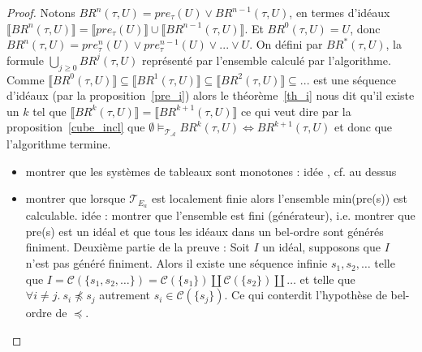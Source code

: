 \documentclass[a4paper, twoside]{scrartcl}
\theoremstyle{plain}%
\theoremstyle{definition}
\theoremstyle{remark}
\begin{document}
\begin{proof}

  Notons $BR^n(\tau, U) = pre_\tau(U) \vee BR^{n-1}(\tau, U)$, en
  termes d'idéaux $\llbracket BR^n(\tau, U) \rrbracket = \llbracket
  pre_\tau(U) \rrbracket \cup \llbracket BR^{n-1}(\tau, U)
  \rrbracket$. Et $BR^0(\tau, U) = U$, donc $BR^n(\tau, U) =
  pre_\tau^n(U) \vee pre_\tau^{n-1}(U) \vee ... \vee U $. On défini
  par $BR^*(\tau, U)$, la formule $\bigcup_{j\ge0} BR^j(\tau, U)$
  représenté par l'ensemble calculé par l'algorithme. Comme
  $\llbracket BR^0(\tau, U) \rrbracket \subseteq \llbracket BR^1(\tau,
  U) \rrbracket \subseteq \llbracket BR^2(\tau, U) \rrbracket
  \subseteq ...$ est une séquence d'idéaux (par la
  proposition~\ref{pre_i}) alors le théorème~\ref{th_i} nous dit qu'il
  existe un $k$ tel que $\llbracket BR^k(\tau, U) \rrbracket =
  \llbracket BR^{k+1}(\tau, U) \rrbracket$
  ce qui veut dire par la proposition~\ref{cube_incl} que $\emptyset
  \vDash_{\mathcal{T_A}} BR^k(\tau, U) \iff BR^{k+1}(\tau, U)$ et donc
  que l'algorithme termine.



  \bigskip
  \begin{itemize}
  \item montrer que les systèmes de tableaux sont monotones : idée ,
    cf. au dessus
  \item montrer que lorsque $\mathcal{T}_{E_a}$ est localement finie
    alors l'ensemble min(pre(s)) est calculable. idée : montrer que
    l'ensemble est fini (générateur), i.e. montrer que pre(s) est un
    idéal et que tous les idéaux dans un bel-ordre sont générés
    finiment. Deuxième partie de la preuve : Soit $I$ un idéal,
    supposons que $I$ n'est pas généré finiment. Alors il existe une
    séquence infinie $s_1, s_2, \ldots$ telle que $I =
    \mathcal{C}(\{s_1, s_2, \ldots\}) = \mathcal{C}(\{s_1\}) \coprod 
    \mathcal{C}(\{s_2\}) \coprod \ldots$ et telle que $\forall i \neq
    j.~ s_i \not \preceq s_j$ autrement $s_i \in
    \mathcal{C}(\{s_j\})$. Ce qui conterdit l'hypothèse de bel-ordre
    de $\preceq$.


\end{itemize}
\end{proof}
\end{document}

